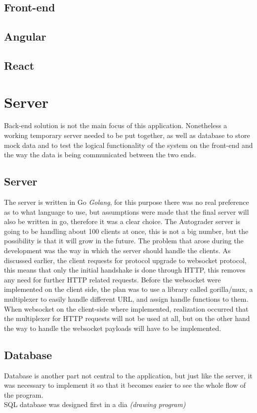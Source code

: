 \subsection{Front-end}
\subsection{Angular}
\subsection{React}

\section{Server}
Back-end solution is not the main focus of this application. Nonetheless a working temporary server needed to be put together, as well as database to store mock data and to test the logical functionality of the system on the front-end and the way the data is being communicated between the two ends.
\subsection{Server}
The server is written in Go \emph{Golang}, for this purpose there was no real  preference as to what language to use, but assumptions were made that the final server will also be written in go, therefore it was a clear choice. The Autograder server is going to be handling about 100 clients at once,  this is not a big number, but the possibility is that it will grow in the future. The problem that arose during the development was the way in which the server should handle the clients. As discussed earlier, the client requests for protocol upgrade to websocket protocol, this means that only the initial handshake is done through HTTP, this removes any need for further HTTP related requests. Before the websocket were implemented on the client side, the plan was to use a library called gorilla/mux, a multiplexer to easily handle different URL, and assign handle functions to them. When websocket on the client-side where implemented, realization occurred that the multiplexer for HTTP requests will not be used at all, but on the other hand the way to handle the websocket payloads will have to be implemented. 
\subsection{Database}
Database is another part not central to the application, but just like the server, it was necessary to implement it so that it becomes easier to see the whole flow of the program.
\\SQL database was designed first in a dia \emph{(drawing program)} 

